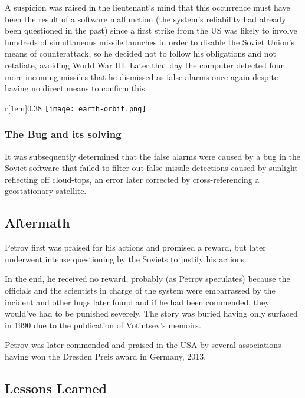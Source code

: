 \documentclass[12pt,a4paper,notitlepage]{article}
\begin{document}
A suspicion was raised in the lieutenant’s mind that this occurrence must have been the result of a software malfunction (the system’s reliability had already been questioned in the past) since a first strike from the US was likely to involve hundreds of simultaneous missile launches in order to disable the Soviet Union’s means of counterattack, so he decided not to follow his obligations and not retaliate, avoiding World War III.
Later that day the computer detected four more incoming missiles that he dismissed as false alarms once again despite having no direct means to confirm this.

\begin{wrapfigure}[11]{r}[1em]{0.38\textwidth}
	\vspace{\baselineskip}
	\texttt{[image: earth-orbit.png]}
\end{wrapfigure}

\subsubsection{The Bug and its solving}

It was subsequently determined that the false alarms were caused by a bug in the Soviet software that failed to filter out false missile detections caused by sunlight reflecting off cloud-tops, an error later corrected by cross-referencing a geostationary satellite.

\subsection{Aftermath}

Petrov first was praised for his actions and promised a reward, but later underwent intense questioning by the Soviets to justify his actions. 

In the end, he received no reward, probably (as Petrov speculates) because the officials and the scientists in charge of the system were embarrassed by the incident and other bugs later found and if he had been commended,  they would’ve had to be punished severely.
The story was buried having only surfaced in 1990 due to the publication of Votintsev’s memoirs.

Petrov was later commended and praised in the USA by several associations having won the Dresden Preis award in Germany, 2013.

\subsection{Lessons Learned}
\end{document}
